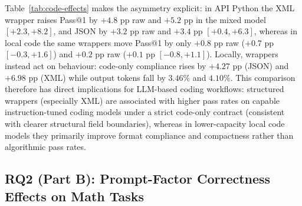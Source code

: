 \documentclass[a4paper,fleqn]{cas-sc}
\begin{document}
Table~\ref{tab:code-effects} makes the asymmetry explicit: in API Python the XML wrapper raises Pass@1 by $+4.8$ pp raw and $+5.2$ pp in the mixed model $[+2.3, +8.2]$, and JSON by $+3.2$ pp raw and $+3.4$ pp $[+0.4, +6.3]$, whereas in local code the same wrappers move Pass@1 by only $+0.8$ pp raw ($+0.7$ pp $[-0.3, +1.6]$) and $+0.2$ pp raw ($+0.1$ pp $[-0.8, +1.1]$). Locally, wrappers instead act on behaviour: code-only compliance rises by $+4.27$ pp (JSON) and $+6.98$ pp (XML) while output tokens fall by $3.46\%$ and $4.10\%$. This comparison therefore has direct implications for LLM-based coding workflows: structured wrappers (especially XML) are associated with higher pass rates on capable instruction-tuned coding models under a strict code-only contract (consistent with clearer structural field boundaries), whereas in lower-capacity local code models they primarily improve format compliance and compactness rather than algorithmic pass rates.

\subsection{RQ2 (Part B): Prompt-Factor Correctness Effects on Math Tasks}\label{prompt-factor-effects-on-math-tasks}
\end{document}
